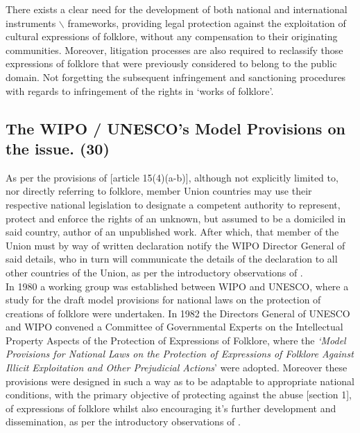 \documentclass[11pt]{article}
\begin{document}
There exists a clear need for the development of both national and international
instruments $\backslash$ frameworks, providing legal protection against the exploitation of
cultural expressions of folklore, without any compensation to their originating
communities. Moreover, litigation processes are also required to reclassify
those expressions of folklore that were previously considered to belong to the
public domain. Not forgetting the subsequent infringement and sanctioning
procedures with regards to infringement of the rights in `works of folklore'.

\subsection{The WIPO / UNESCO's Model Provisions on the issue. (30)}
\label{sec:org7d08ce3}

As per the provisions of [article 15(4)(a-b)]\cite{wipo86_berne}, although not
explicitly limited to, nor directly referring to folklore, member Union
countries may use their respective national legislation to designate a competent
authority to represent, protect and enforce the rights of an unknown, but
assumed to be a domiciled in said country, author of an unpublished work.
After which, that member of the Union must by way of written declaration notify
the WIPO Director General of said details, who in turn will communicate the
details of the declaration to all other countries of the Union, as per the
introductory observations of \cite{wipo85_model_provi_national_laws_folklore}.\\

In 1980 a working group was established between WIPO and UNESCO, where a study
for the draft model provisions for national laws on the protection of creations
of folklore were undertaken. In 1982 the Directors General of UNESCO and WIPO
convened a Committee of Governmental Experts on the Intellectual Property
Aspects of the Protection of Expressions of Folklore, where the \emph{`Model Provisions for National Laws on the Protection of Expressions of Folklore
Against Illicit Exploitation and Other Prejudicial Actions}' were adopted.
Moreover these provisions were designed in such a way as to be adaptable to
appropriate national conditions, with the primary objective of protecting
against the abuse [section 1]\cite{wipo85_model_provi_national_laws_folklore}, of
expressions of folklore whilst also encouraging it's further development and
dissemination, as per the introductory observations of
\cite{wipo85_model_provi_national_laws_folklore}.\\
\end{document}
